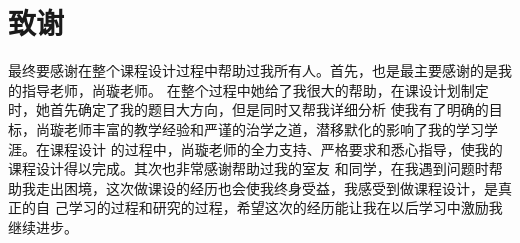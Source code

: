 \section{致谢}
最终要感谢在整个课程设计过程中帮助过我所有人。首先，也是最主要感谢的是我的指导老师，尚璇老师。
在整个过程中她给了我很大的帮助，在课设计划制定时，她首先确定了我的题目大方向，但是同时又帮我详细分析
使我有了明确的目标，尚璇老师丰富的教学经验和严谨的治学之道，潜移默化的影响了我的学习学涯。在课程设计
的过程中，尚璇老师的全力支持、严格要求和悉心指导，使我的课程设计得以完成。其次也非常感谢帮助过我的室友
和同学，在我遇到问题时帮助我走出困境，这次做课设的经历也会使我终身受益，我感受到做课程设计，是真正的自
己学习的过程和研究的过程，希望这次的经历能让我在以后学习中激励我继续进步。

